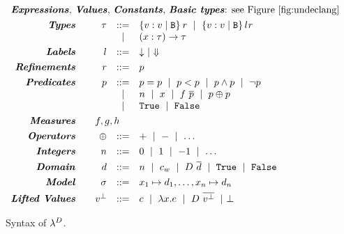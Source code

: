 
\renewcommand\restrictdecidable[2]{#1}
\newcommand\samerule[1]{}


\begin{figure}[t!]
\centering
\captionsetup{justification=centering}
$$
\begin{array}{rrcl}
\multicolumn{4}{l}{\text{\emphbf{Expressions}, \emphbf{Values}, \emphbf{Constants}, \emphbf{Basic types}:
see Figure~\ref{fig:undeclang}}} \\[0.05in]

\emphbf{Types} \quad 
  & \tau
  & ::=  
  & 	 \tref{v}{\ttbase}{}{\refi}
  \spmid \tref{v}{\ttbase}{l}{\refi}\\
  &&
  \spmid & \tfunref{x}{\tau}{\tau}{v}{\refi}   \\[0.05in]

\emphbf{Labels} \quad 
  & l
  & ::= 
  & \trivial \spmid \finite 
  \\[0.05in] 

\emphbf{Refinements} \quad 
  & \refi
  & ::=
  & p
  \\[0.05in] 

\emphbf{Predicates} \quad 
  & p
  & ::= 
  &   	 \lterm = \lterm
  \spmid \lterm < \lterm
  \spmid       p \land p
  \spmid \lnot p\\
  &&
  \spmid &   	 n 
  \spmid x 
  \spmid f \ \overline{\lterm}
  \spmid \lterm \oplus \lterm
  \\ && \spmid &
  \etrue
  \spmid \efalse 
  \\[0.05in] 

\emphbf{Measures} \quad 
  & \multicolumn{3}{l}{f,g,h}
  \\[0.05in] 
  
\emphbf{Operators} \quad 
  & \oplus
  & ::= 
  &   	 + 
  \spmid -  
  \spmid \dots
  \\[0.05in] 
  
\emphbf{Integers} \quad 
  & n
  & ::= 
  &   	 0 
  \spmid 1
  \spmid -1
  \spmid \dots
  \\[0.05in] 

\emphbf{Domain} \quad 
  & d
  & ::= 
  & n 
  \spmid c_w 
  \spmid D\ \overline{d}  
  \spmid \etrue
  \spmid \efalse
  \\[0.05in] 
  
\emphbf{Model} \quad 
  & \sigma & ::= & \gbind{x_1}{d_1},\ldots,\gbind{x_n}{d_n}
  \\[0.05in] 

\emphbf{Lifted Values} \quad 
  & \botv
  & ::= 
  &   	 c 
  \spmid \efun{x}{}{e} 
  \spmid D \ \overline{\botv}
  \spmid \ebot
\end{array}
$$
\caption{Syntax of $\protect\declang$.}
\label{fig:declang:syntax}
\end{figure}


